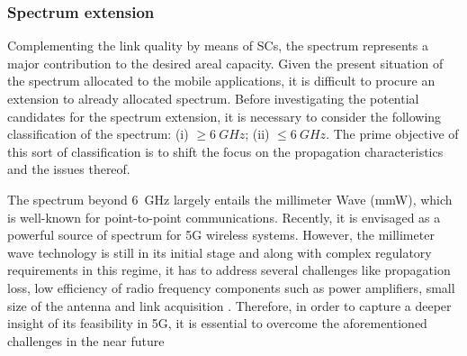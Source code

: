 \subsubsection*{Spectrum extension}
Complementing the link quality by means of SCs, the spectrum represents a major contribution to the desired areal capacity. Given the present situation of the spectrum allocated to the mobile applications, it is difficult to procure an extension to already allocated spectrum. Before investigating the potential candidates for the spectrum extension, it is necessary to consider the following classification of the spectrum:
(i) $\ge \SI{6}{GHz}$;
(ii) $\le \SI{6}{GHz}$.
The prime objective of this sort of classification is to shift the focus on the propagation characteristics and the issues thereof.


The spectrum beyond \SI{6}{GHz} largely entails the millimeter Wave (mmW), which is well-known for point-to-point communications. Recently, it is envisaged as a powerful source of spectrum for 5G wireless systems. However, the millimeter wave technology is still in its initial stage and along with complex regulatory requirements in this regime, it has to address several challenges like propagation loss, low efficiency of radio frequency components such as power amplifiers, small size of the antenna and link acquisition \cite{Rapp13}. Therefore, in order to capture a deeper insight of its feasibility in 5G, it is essential to overcome the aforementioned challenges in the near future

